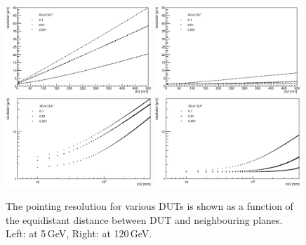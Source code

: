 \begin{figure}[tbp]
  \centering
  \includegraphics[width=0.49\textwidth]{figures/CalcResoAtDesy}
  \includegraphics[width=0.49\textwidth]{figures/CalcResoAtSPS}\\
  \includegraphics[width=0.49\textwidth]{figures/CalcResoAtDesy_loglog}
  \includegraphics[width=0.49\textwidth]{figures/CalcResoAtSPS_loglog}
  \caption[Pointing resolution for various DUTs as a function of the distance between DUT and neighbouring planes]{
  The pointing resolution for various DUTs is shown as a function of the equidistant distance between DUT and neighbouring planes.
  Left: at 5\,GeV, Right: at 120\,GeV. }
\label{fig:CalcResos}
\end{figure}
